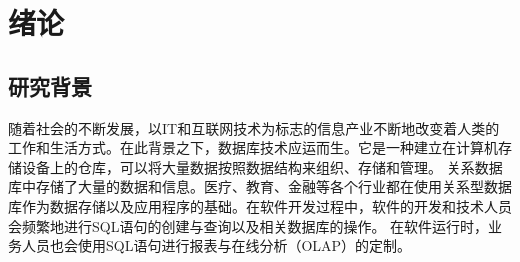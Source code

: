 




\chapter{绪论}
\label{chap:intro}
\section{研究背景}
\label{intro:background}
随着社会的不断发展，以IT和互联网技术为标志的信息产业不断地改变着人类的工作和生活方式。在此背景之下，数据库技术应运而生。它是一种建立在计算机存储设备上的仓库，可以将大量数据按照数据结构来组织、存储和管理。
关系数据库中存储了大量的数据和信息。医疗、教育、金融等各个行业都在使用关系型数据库作为数据存储以及应用程序的基础。在软件开发过程中，软件的开发和技术人员会频繁地进行SQL语句的创建与查询以及相关数据库的操作。
在软件运行时，业务人员也会使用SQL语句进行报表与在线分析（OLAP）的定制。

